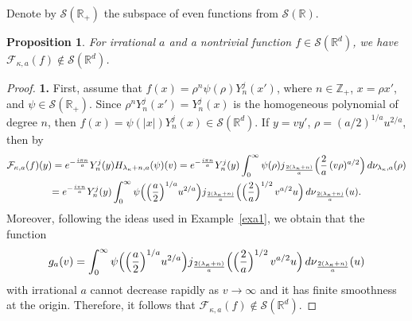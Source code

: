 \documentclass[12pt,twoside,reqno]{amsart}\usepackage[cp1251]{inputenc}
\theoremstyle{plain}
\newtheorem{proposition}[theorem]{Proposition}
\theoremstyle{remark}
\begin{document}
Denote  by $\mathcal{S}(\mathbb{R}_+)$ the subspace of even functions from  $\mathcal{S}(\mathbb{R})$.

\begin{proposition}
For irrational  $a$ and a nontrivial function $f\in\mathcal{S}(\mathbb{R}^d)$, we have %
$\mathcal{F}_{\kappa,a}(f)\notin\mathcal{S}(\mathbb{R}^d)$.
\end{proposition}

\begin{proof} \textbf{1.} First, assume that  $f(x)=\rho^n\psi(\rho)Y_n^j(x')$, where $n\in\mathbb{Z}_+$, $x=\rho x'$, and $\psi\in\mathcal{S}(\mathbb{R}_+)$.
Since  $\rho^nY_n^j(x')=Y_n^j(x)$ is the homogeneous polynomial of degree $n$, then $f(x)=\psi(|x|)Y_n^j(x)\in\mathcal{S}(\mathbb{R}^d)$.
If $y=vy'$, $\rho=(a/2)^{1/a}u^{2/a}$, then by \cite{GIT16}
\begin{multline*}
\mathcal{F}_{\kappa,a}(f)(y)=e^{-\frac{i\pi n}{a}}Y_n^j(y)H_{\lambda_{\kappa}+n,a}(\psi)(v)
=e^{-\frac{i\pi n}{a}}Y_n^j(y)\int_{0}^{\infty}\psi(\rho)j_{\frac{2(\lambda_{\kappa}+n)}{a}}\Bigl(\frac{2}{a}\,(v\rho)^{a/2} \Bigr)\,d\nu_{\lambda_{\kappa},a}(\rho)\\
=e^{-\frac{i\pi n}{a}}Y_n^j(y)\int_{0}^{\infty}\psi\Bigl(\Bigl(\frac{a}{2}\Bigr)^{1/a}u^{2/a}\Bigr)
j_{\frac{2(\lambda_{\kappa}+n)}{a}}\Bigl(\Bigl(\frac{2}{a}\Bigr)^{1/2}\,v^{a/2}u \Bigr)\,d\nu_{\frac{2(\lambda_{\kappa}+n)}{a}}(u).
\end{multline*}
Moreover, following the ideas used in Example~\ref{exa1},
we obtain that the function
\[
g_a(v)=\int_{0}^{\infty}\psi\Bigl(\Bigl(\frac{a}{2}\Bigr)^{1/a}u^{2/a}\Bigr)j_{\frac{2(\lambda_{\kappa}+n)}{a}}\Bigl(\Bigl(\frac{2}{a}\Bigr)^{1/2}\,v^{a/2}u \Bigr)\,d\nu_{\frac{2(\lambda_{\kappa}+n)}{a}}(u)
\]
with irrational $a$ cannot decrease rapidly as $v\to\infty$ and it has finite smoothness at the origin.
Therefore, it follows that  %
 $\mathcal{F}_{\kappa,a}(f)\notin \mathcal{S}(\mathbb{R}^d)$.


\end{proof}
\end{document}
